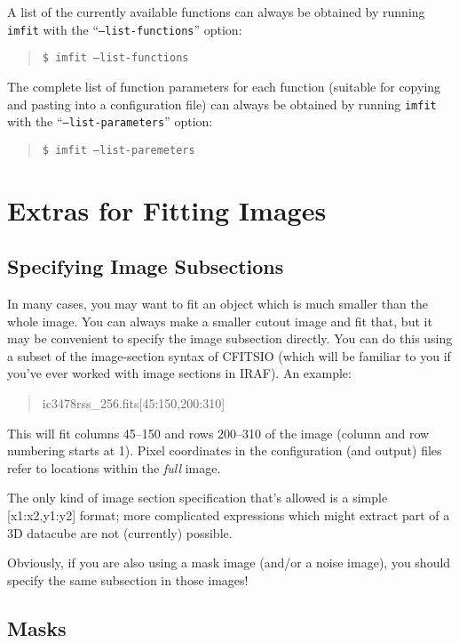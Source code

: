 \documentclass[10pt]{article}
\newcommand{\imfit}{\texttt{imfit}}
\begin{document}
A list of the currently available functions can always be obtained
by running \imfit{} with the ``\texttt{--list-functions}'' option:
\begin{quote}
  \texttt{\$ \imfit{} --list-functions}
\end{quote}
The complete list of function parameters for each function (suitable for copying
and pasting into a configuration file) can always be
obtained by running \imfit{} with the ``\texttt{--list-parameters}'' option:
\begin{quote}
  \texttt{\$ \imfit{} --list-paremeters}
\end{quote}




\section{Extras for Fitting Images}

\subsection{Specifying Image Subsections}

In many cases, you may want to fit an object which is much smaller than the whole
image. You can always make a smaller cutout image and fit that, but it may be convenient to
specify the image subsection directly. You can do this using a subset of the image-section
syntax of CFITSIO (which will be familiar to you if you've ever worked with
image sections in IRAF). An example:

\begin{quote}
ic3478rss\_256.fits[45:150,200:310]
\end{quote}
This will fit columns 45--150 and rows 200--310 of the image (column and row
numbering starts at 1). Pixel coordinates in the configuration (and output)
files refer to locations within the \textit{full} image.

The only kind of image section specification that's allowed is a simple [x1:x2,y1:y2]
format; more complicated expressions which might extract part of a 3D datacube
are not (currently) possible.

Obviously, if you are also using a mask image (and/or a noise image), you should
specify the same subsection in those images!



\subsection{Masks}
\end{document}
